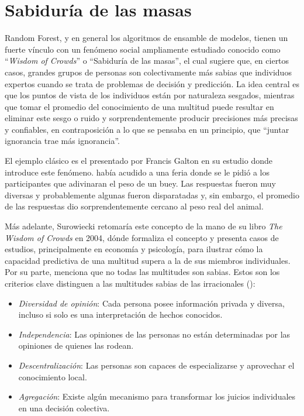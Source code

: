 \section{Sabiduría de las masas}

Random Forest, y en general los algoritmos de ensamble de modelos, tienen un fuerte vínculo con un fenómeno social ampliamente estudiado conocido como “\textit{Wisdom of Crowds}” o “Sabiduría de las masas”, el cual sugiere que, en ciertos casos, grandes grupos de personas son colectivamente más sabias que individuos expertos cuando se trata de problemas de decisión y predicción. La idea central es que los puntos de vista de los individuos están por naturaleza sesgados, mientras que tomar el promedio del conocimiento de una multitud puede resultar en eliminar este sesgo o ruido y sorprendentemente producir precisiones más precisas y confiables, en contraposición a lo que se pensaba en un principio, que “juntar ignorancia trae más ignorancia”.

El ejemplo clásico es el presentado por Francis Galton en su estudio donde introduce este fenómeno. \cite{galtonFrancis} había acudido a una feria donde se le pidió a los participantes que adivinaran el peso de un buey. Las respuestas fueron muy diversas y probablemente algunas fueron disparatadas y, sin embargo, el promedio de las respuestas dio sorprendentemente cercano al peso real del animal.

Más adelante, Surowiecki retomaría este concepto de la mano de su libro \textit{The Wisdom of Crowds} en 2004, dónde formaliza el concepto y presenta casos de estudios, principalmente en economía y psicología, para ilustrar cómo la capacidad predictiva de una multitud supera a la de sus miembros individuales. Por su parte, \cite{mackeyMadnessCrowds} menciona que no todas las multitudes son sabias. Estos son los criterios clave distinguen a las multitudes sabias de las irracionales (\cite{surowieckiWisdomCrowdsWhy2004}):

\begin{itemize}
    \item \textit{Diversidad de opinión}: Cada persona posee información privada y diversa, incluso si solo es una interpretación de hechos conocidos.
    \item \textit{Independencia}: Las opiniones de las personas no están determinadas por las opiniones de quienes las rodean.
    \item \textit{Descentralización}: Las personas son capaces de especializarse y aprovechar el conocimiento local.
    \item \textit{Agregación}: Existe algún mecanismo para transformar los juicios individuales en una decisión colectiva.
\end{itemize}

